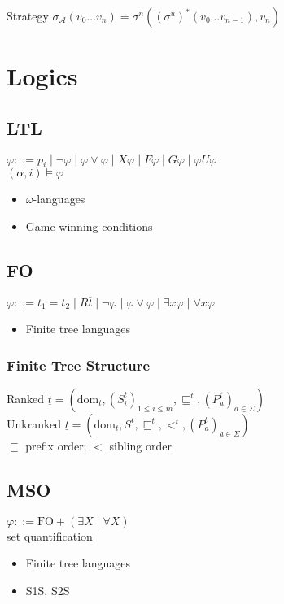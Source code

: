 \documentclass{article}
\begin{document}
Strategy $\sigma_\mathcal{A}(v_0 \dots v_n) = \sigma^n((\sigma^u)^*(v_0 \dots v_{n-1}), v_n)$


\newpage
\section{Logics}
\subsection{LTL}
$\varphi ::= p_i \mid \neg \varphi \mid \varphi \lor \varphi \mid X \varphi \mid F \varphi \mid G \varphi \mid \varphi U \varphi$
\\
$(\alpha, i) \models \varphi$

\begin{itemize}
	\item $\omega$-languages
	\item Game winning conditions
\end{itemize}

\subsection{FO}
$\varphi ::= t_1 = t_2 \mid R\overline{t} \mid \neg \varphi \mid \varphi \lor \varphi \mid \exists x \varphi \mid \forall x \varphi$

\begin{itemize}
	\item Finite tree languages 
\end{itemize}

\subsubsection*{Finite Tree Structure}
Ranked $\underline{t} = (\text{dom}_t, (S_i^t)_{1 \leq i \leq m}, \sqsubseteq^t, (P_a^t)_{a \in \Sigma})$ \\
Unkranked $\underline{t} = (\text{dom}_t, S^t, \sqsubseteq^t, <^t, (P_a^t)_{a \in \Sigma})$ \\
$\sqsubseteq$ prefix order; $<$ sibling order

\subsection{MSO}
$\varphi ::= \text{FO} + (\exists X \mid \forall X)$ \\
set quantification

\begin{itemize}
	\item Finite tree languages
	\item S1S, S2S
\end{itemize}
\end{document}
